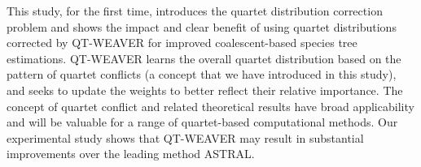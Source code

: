 \documentclass[10pt,a4paper]{article}
\begin{document}




This study, for the first time, introduces the quartet distribution correction problem and shows the impact and clear benefit of using quartet distributions corrected by QT-WEAVER for improved coalescent-based species tree estimations. %
QT-WEAVER learns the overall quartet distribution based on the pattern of quartet conflicts (a concept that we have introduced in this study), and seeks to update the weights to better reflect their relative importance. The concept of quartet conflict and related theoretical results have broad applicability and will be valuable for a range of quartet-based computational methods. Our experimental study shows that QT-WEAVER may result in substantial improvements over the leading method ASTRAL.
\end{document}
